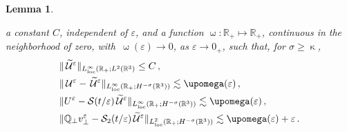 \documentclass[11pt,reqno]{amsart}
\newtheorem{lemma}{Lemma}
\def \R{{\mathbb{R}}}
\def \Q{{\mathbb{Q}}}
\begin{document}
\begin{lemma}
\begin{itemize}
  a constant  $C$, independent of $\varepsilon$, and a function $\upomega : \R_+ \mapsto \R_+$, continuous in the neighborhood of zero, with $\, \upomega(\varepsilon) \rightarrow 0$, as $\varepsilon \rightarrow 0_+$, such that,  for $\sigma \geq \upkappa$,  
 \begin{align}
   &  \| \,\widetilde{\mathcal U}^\varepsilon\|_{L_{\rm loc}^\infty(\R_+;L^2(\R^3)} \leq C\,, \label{eqlem:AUXR5} \\
   & \| \, \mathcal U^\varepsilon - \,\widetilde{\mathcal U}^\varepsilon\|_{L_{\rm loc}^\infty(\R_+;H^{-\sigma}(\R^3))} \lesssim \upomega(\varepsilon)\,,   \label{eqlem:AUXR6} \\
   &  \| U^\varepsilon - \mathcal S (t/\varepsilon)\,\widetilde{\mathcal U}^\varepsilon \|_{L_{\rm loc}^\infty(\R_+;H^{-\sigma}(\R^3))} \lesssim \upomega(\varepsilon)\,,  \label{eqlem:AUXR7}\\
   & \| \Q_\perp v_\perp^\varepsilon - \mathcal S_2 (t/\varepsilon)\,\widetilde{\mathcal U}^\varepsilon \|_{L_{\rm loc}^2(\R_+;H^{-\sigma}(\R^3))} \lesssim \upomega(\varepsilon) + \varepsilon\,.  \label{eqlem:AUXR8}
  \end{align}
\end{itemize}
\end{lemma}  
\end{document}
